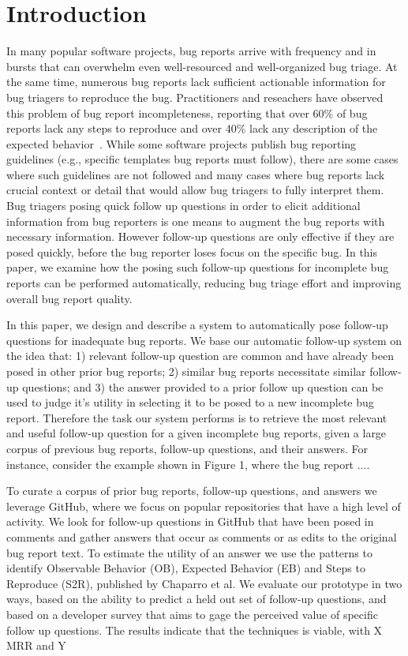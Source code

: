 \section{Introduction}

In many popular software projects, bug reports arrive with frequency and in bursts that can overwhelm even well-resourced and well-organized bug triage. At the same time, numerous bug reports lack sufficient actionable information for bug triagers to reproduce the bug. Practitioners and reseachers have observed this problem of bug report incompleteness, reporting that over 60\% of bug reports lack any steps to reproduce and over 40\% lack any description of the expected behavior~\cite{chaparro17detecting}. While some software projects publish bug reporting guidelines (e.g., specific templates bug reports must follow), there are some cases where such guidelines are not followed and many cases where bug reports lack crucial context or detail that would allow bug triagers to fully interpret them. Bug triagers posing quick follow up questions in order to elicit additional information from bug reporters is one means to augment the bug reports with necessary information. However follow-up questions are only effective if they are posed quickly, before the bug reporter loses focus on the specific bug. In this paper, we examine how the posing such follow-up questions for incomplete bug reports can be performed automatically, reducing bug triage effort and improving overall bug report quality.

In this paper, we design and describe a system to automatically pose follow-up questions for inadequate bug reports. We base our automatic follow-up system on the idea that: 1) relevant follow-up question are common and have already been posed in other prior bug reports; 2) similar bug reports necessitate similar follow-up questions; and 3) the answer provided to a prior follow up question can be used to judge it's utility in selecting it to be posed to a new incomplete bug report. Therefore the task our system performs is to retrieve the most relevant and useful follow-up question for a given incomplete bug reports, given a large corpus of previous bug reports, follow-up questions, and their answers.
For instance, consider the example shown in Figure 1, where the bug report ....

To curate a corpus of prior bug reports, follow-up questions, and answers we leverage GitHub, where we focus on popular repositories that have a high level of activity. We look for follow-up questions in GitHub that have been posed in comments and gather answers that occur as comments or as edits to the original bug report text. To estimate the utility of an answer we use the patterns to identify Observable Behavior (OB), Expected Behavior (EB) and Steps to Reproduce (S2R), published by Chaparro et al. We evaluate our prototype in two ways, based on the ability to predict a held out set of follow-up questions, and based on a developer survey that aims to gage the perceived value of specific follow up questions. The results indicate that the techniques is viable, with X MRR and Y%

